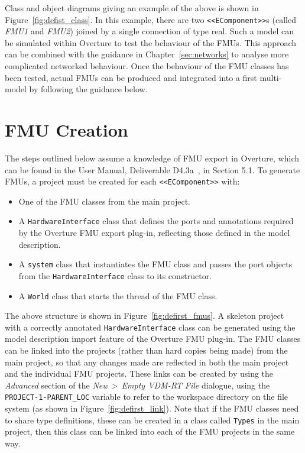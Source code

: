 Class and object diagrams giving an example of the above is shown in Figure~\ref{fig:defist_class}. In this example, there are two \texttt{<<EComponent>>}s (called \emph{FMU1} and \emph{FMU2}) joined by a single connection of type real. Such a model can be simulated within Overture to test the behaviour of the FMUs. This approach can be combined with the guidance in Chapter~\ref{sec:networks} to analyse more complicated networked behaviour. Once the behaviour of the FMU classes has been tested, actual FMUs can be produced and integrated into a first multi-model by following the guidance below.

\section{FMU Creation}

The steps outlined below assume a knowledge of FMU export in Overture, which can be found in the User Manual, Deliverable D4.3a~\cite{INTOCPSD4.3a}, in Section 5.1. To generate FMUs, a project must be created for each \texttt{<<EComponent>>} with:

\begin{itemize}[noitemsep]
\item One of the FMU classes from the main project.
\item A \texttt{HardwareInterface} class that defines the ports and annotations required by the Overture FMU export plug-in, reflecting those defined in the model description.
\item A \texttt{system} class that instantiates the FMU class and passes the port objects from the \texttt{HardwareInterface} class to its constructor.
\item A \texttt{World} class that starts the thread of the FMU class.
\end{itemize}

The above structure is shown in Figure~\ref{fig:defirst_fmus}. A skeleton project with a correctly annotated \texttt{HardwareInterface} class can be generated using the model description import feature of the Overture FMU plug-in. The FMU classes can be linked into the projects (rather than hard copies being made) from the main project, so that any changes made are reflected in both the main project and the individual FMU projects. These links can be created by using the \emph{Advanced} section of the \emph{New \textgreater\ Empty VDM-RT File} dialogue, using the \texttt{PROJECT-1-PARENT\_LOC} variable to refer to the workspace directory on the file system (as shown in Figure~\ref{fig:defirst_link}). Note that if the FMU classes need to share type definitions, these can be created in a class called \texttt{Types} in the main project, then this class can be linked into each of the FMU projects in the same way.

